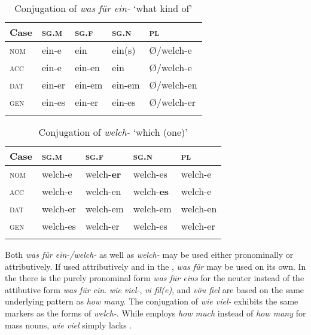 \begin{table}
\caption{Conjugation of \textit{was für ein-} ‘what kind of’}
\label{tab:indo:6}

\begin{tabularx}{\textwidth}{XXXXl}
\lsptoprule

\textbf{Case} & \textbf{\textsc{sg.m}} & \textbf{\textsc{sg.f}} & \textbf{\textsc{sg.n}} & \textbf{\textsc{pl}}\\
\midrule
\textsc{nom} & ein-e & ein & ein(s) & Ø/welch-e\\
\textsc{acc} & ein-e & ein-en & ein & Ø/welch-e\\
\textsc{dat} & ein-er & ein-em & ein-em & Ø/welch-en\\
\textsc{gen} & ein-es & ein-er & ein-es & Ø/welch-er\\
\lspbottomrule
\end{tabularx}
\end{table}

\begin{table}
\caption{Conjugation of \textit{welch-} ‘which (one)’}
\label{tab:indo:7}

\begin{tabularx}{\textwidth}{XXXXl}
\lsptoprule

\textbf{Case} & \textbf{\textsc{sg.m}} & \textbf{\textsc{sg.f}} & \textbf{\textsc{sg.n}} & \textbf{\textsc{pl}}\\
\midrule
\textsc{nom} & welch-e & welch-\textbf{er} & welch-es & welch-e\\
\textsc{acc} & welch-e & welch-en & welch-\textbf{es} & welch-e\\
\textsc{dat} & welch-er & welch-em & welch-em & welch-en\\
\textsc{gen} & welch-es & welch-er & welch-es & welch-er\\
\lspbottomrule
\end{tabularx}
\end{table}

Both \textit{was für ein-/welch-} as well as \textit{welch-} may be used either pronominally or attributively. If used attributively and in the , \textit{was für} may be used on its own. In the  there is the purely pronominal form \textit{was für eins} for the neuter instead of the attibutive form \textit{was für ein}.  \textit{wie viel-},  \textit{vi fil(e)}, and  \textit{vöu fiel} are based on the same underlying pattern as  \textit{how many}. The conjugation of \textit{wie viel-} exhibits the same  markers as the  forms of \textit{welch-}. While  employs \textit{how much} instead of \textit{how many} for mass nouns,  \textit{wie viel} simply lacks .

